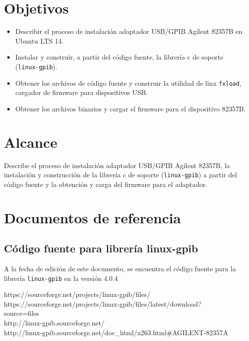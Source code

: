 \documentclass[paper=letter,oneside,fontsize=11pt, parskip=full]{scrartcl}
\newenvironment{link}
	{\ttfamily}{}
\begin{document}
	
	\clearpage
	
	\tableofcontents
	
	\section{Objetivos}
		\begin{itemize}
			\item  Describir el proceso de instalación adaptador USB/GPIB Agilent 82357B en Ubuntu LTS 14.
			\item Instalar y construir, a partir del código fuente, la librería c de soporte (\texttt{linux-gpib}).
			\item Obtener los archivos de código fuente y construir la utilidad de linx \texttt{fxload}, cargador de firmware para dispositivos USB.
			\item Obtener los archivos binarios y cargar el firmware para el dispositivo 82357B.
		\end{itemize}
		
	\section{Alcance}
		Describe el proceso de instalación adaptador USB/GPIB Agilent 82357B, la instalación y construcción de la librería c de soporte (\texttt{linux-gpib}) a partir del código fuente y la obtención y carga del firmware para el adaptador.
	
		
	\section{Documentos de referencia}
	\subsection{Código fuente para librería linux-gpib}
	A la fecha de edición de este documento, se encuentra el código fuente para la librería \texttt{linux-gpib} en la versión 4.0.4 
	
	\begin{link}
		https://sourceforge.net/projects/linux-gpib/files/	\\	
		https://sourceforge.net/projects/linux-gpib/files/latest/download? \\ 
		source=files \\
		http://linux-gpib.sourceforge.net/ 	\\	
		http://linux-gpib.sourceforge.net/doc\_html/x263.html\#AGILENT-82357A
	\end{link}	
	
\end{document}
